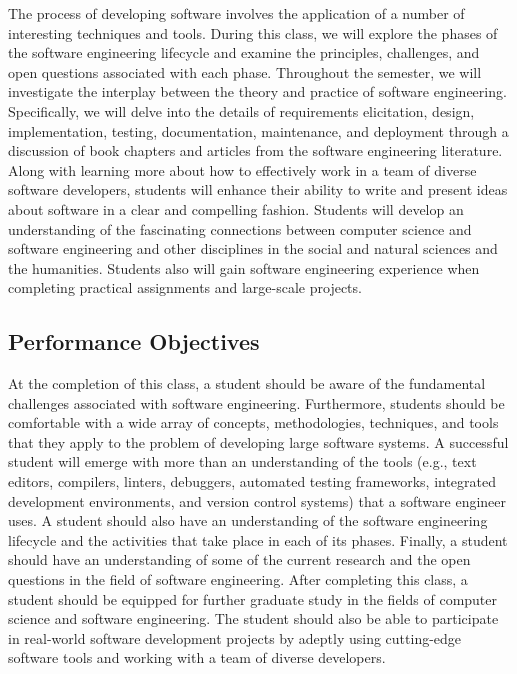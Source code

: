 \documentclass[11pt]{article}
\begin{document}
The process of developing software involves the application of a number of
interesting techniques and tools. During this class, we will explore the phases
of the software engineering lifecycle and examine the principles, challenges,
and open questions associated with each phase. Throughout the semester, we will
investigate the interplay between the theory and practice of software
engineering. Specifically, we will delve into the details of requirements
elicitation, design, implementation, testing, documentation, maintenance, and
deployment through a discussion of book chapters and articles from the software
engineering literature. Along with learning more about how to effectively work
in a team of diverse software developers, students will enhance their ability
to write and present ideas about software in a clear and compelling fashion.
Students will develop an understanding of the fascinating connections between
computer science and software engineering and other disciplines in the social
and natural sciences and the humanities. Students also will gain software
engineering experience when completing practical assignments and large-scale
projects.

\vspace*{-.25em}
\subsection*{Performance Objectives}

At the completion of this class, a student should be aware of the fundamental
challenges associated with software engineering. Furthermore, students should
be comfortable with a wide array of concepts, methodologies, techniques, and
tools that they apply to the problem of developing large software systems. A
successful student will emerge with more than an understanding of the tools
(e.g., text editors, compilers, linters, debuggers, automated testing
frameworks, integrated development environments, and version control systems)
that a software engineer uses. A student should also have an understanding of
the software engineering lifecycle and the activities that take place in each
of its phases. Finally, a student should have an understanding of some of the
current research and the open questions in the field of software engineering.
After completing this class, a student should be equipped for further graduate
study in the fields of computer science and software engineering. The student
should also be able to participate in real-world software development projects
by adeptly using cutting-edge software tools and working with a team of diverse
developers.
\end{document}
